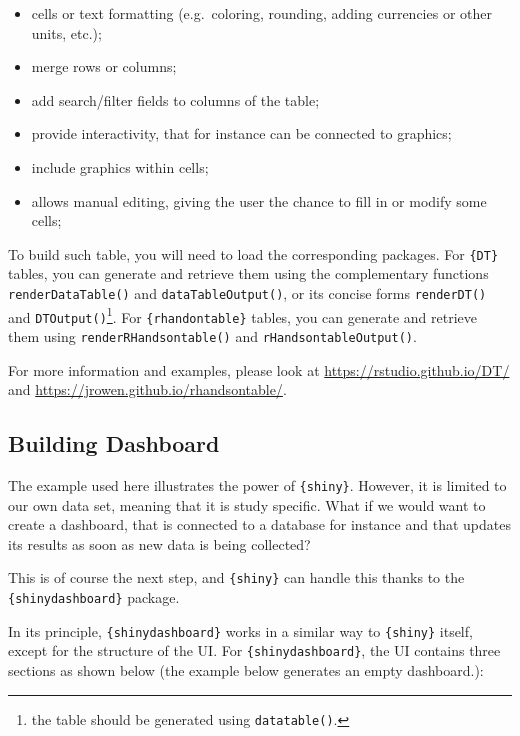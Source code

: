 \documentclass[
]{krantz}
\providecommand{\tightlist}{%
  \setlength{\itemsep}{0pt}\setlength{\parskip}{0pt}}
\begin{document}
\begin{itemize}
\tightlist
\item
  cells or text formatting (e.g.~coloring, rounding, adding currencies or other units, etc.);
\item
  merge rows or columns;
\item
  add search/filter fields to columns of the table;
\item
  provide interactivity, that for instance can be connected to graphics;
\item
  include graphics within cells;
\item
  allows manual editing, giving the user the chance to fill in or modify some cells;
\end{itemize}

To build such table, you will need to load the corresponding packages. For \texttt{\{DT\}} tables, you can generate and retrieve them using the complementary functions \texttt{renderDataTable()} and \texttt{dataTableOutput()}, or its concise forms \texttt{renderDT()} and \texttt{DTOutput()}\footnote{the table should be generated using \texttt{datatable()}.}. For \texttt{\{rhandontable\}} tables, you can generate and retrieve them using \texttt{renderRHandsontable()} and \texttt{rHandsontableOutput()}.

For more information and examples, please look at \url{https://rstudio.github.io/DT/} and \url{https://jrowen.github.io/rhandsontable/}.

\hypertarget{building-dashboard}{%
\subsection{Building Dashboard}\label{building-dashboard}}

The example used here illustrates the power of \texttt{\{shiny\}}. However, it is limited to our own data set, meaning that it is study specific. What if we would want to create a dashboard, that is connected to a database for instance and that updates its results as soon as new data is being collected?

This is of course the next step, and \texttt{\{shiny\}} can handle this thanks to the \texttt{\{shinydashboard\}} package.

In its principle, \texttt{\{shinydashboard\}} works in a similar way to \texttt{\{shiny\}} itself, except for the structure of the UI. For \texttt{\{shinydashboard\}}, the UI contains three sections as shown below (the example below generates an empty dashboard.):
\end{document}
